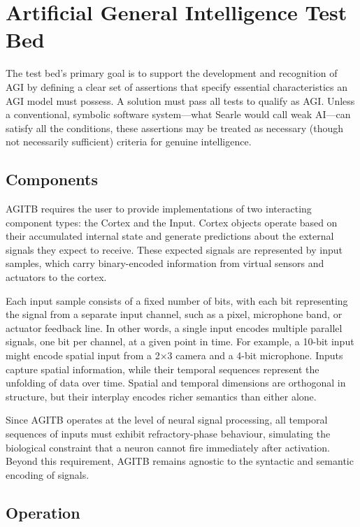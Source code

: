 \documentclass{article}
\begin{document}
\section{Artificial General Intelligence Test Bed}

The test bed's primary goal is to support the development and recognition of AGI by defining a clear set of assertions that specify essential characteristics an AGI model must possess. A solution must pass all tests to qualify as AGI. Unless a conventional, symbolic software system—what Searle \cite{Searle1980} would call weak AI—can satisfy all the conditions, these assertions may be treated as necessary (though not necessarily sufficient) criteria for genuine intelligence.

\subsection{Components}
AGITB requires the user to provide implementations of two interacting component types: the Cortex and the Input. Cortex objects operate based on their accumulated internal state and generate predictions about the external signals they expect to receive. These expected signals are represented by input samples, which carry binary-encoded information from virtual sensors and actuators to the cortex.

Each input sample consists of a fixed number of bits, with each bit representing the signal from a separate input channel, such as a pixel, microphone band, or actuator feedback line. In other words, a single input encodes multiple parallel signals, one bit per channel, at a given point in time. For example, a 10-bit input might encode spatial input from a 2×3 camera and a 4-bit microphone. Inputs capture spatial information, while their temporal sequences represent the unfolding of data over time. Spatial and temporal dimensions are orthogonal in structure, but their interplay encodes richer semantics than either alone. 

Since AGITB operates at the level of neural signal processing, all temporal sequences of inputs must exhibit refractory-phase behaviour, simulating the biological constraint that a neuron cannot fire immediately after activation. Beyond this requirement, AGITB remains agnostic to the syntactic and semantic encoding of signals. 

\subsection{Operation}
\end{document}
